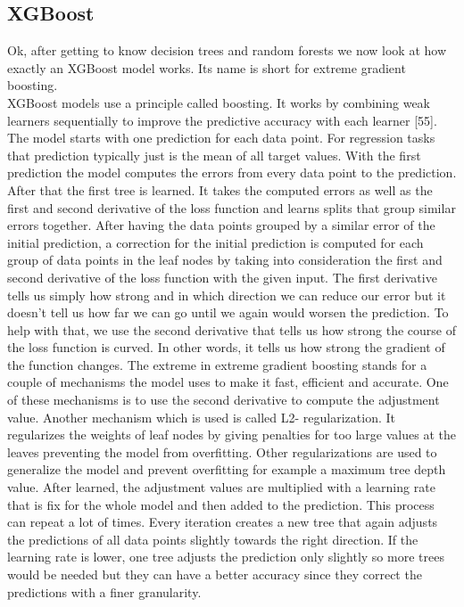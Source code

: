 \documentclass[a4paper,12pt]{report}
\begin{document}
	\subsection{XGBoost}
	
	Ok, after getting to know decision trees and random forests we now look at how exactly an XGBoost model works. Its name is short for extreme gradient boosting. \\
	XGBoost models use a principle called boosting. It works by combining weak learners sequentially to improve the predictive accuracy with each learner [55]. The model starts with one prediction for each data point. For regression tasks that prediction typically just is the mean of all target values. With the first prediction the model computes the errors from every data point to the prediction. After that the first tree is learned. It takes the computed errors as well as the first and second derivative of the loss function and learns splits that group similar errors together. After having the data points grouped by a similar error of the initial prediction, a correction for the initial prediction is computed for each group of data points in the leaf nodes by taking into consideration the first and second derivative of the loss function with the given input. The first derivative tells us simply how strong and in which direction we can reduce our error but it doesn’t tell us how far we can go until we again would worsen the prediction. To help with that, we use the second derivative that tells us how strong the course of the loss function is curved. In other words, it tells us how strong the gradient of the function changes. The extreme in extreme gradient boosting stands for a couple of mechanisms the model uses to make it fast, efficient and accurate. One of these mechanisms is to use the second derivative to compute the adjustment value. Another mechanism which is used is called L2- regularization. It regularizes the weights of leaf nodes by giving penalties for too large values at the leaves preventing the model from overfitting. Other regularizations are used to generalize the model and prevent overfitting for example a maximum tree depth value. After learned, the adjustment values are multiplied with a learning rate that is fix for the whole model and then added to the prediction. This process can repeat a lot of times. Every iteration creates a new tree that again adjusts the predictions of all data points slightly towards the right direction. If the learning rate is lower, one tree adjusts the prediction only slightly so more trees would be needed but they can have a better accuracy since they correct the predictions with a finer granularity. 
	
\end{document}
